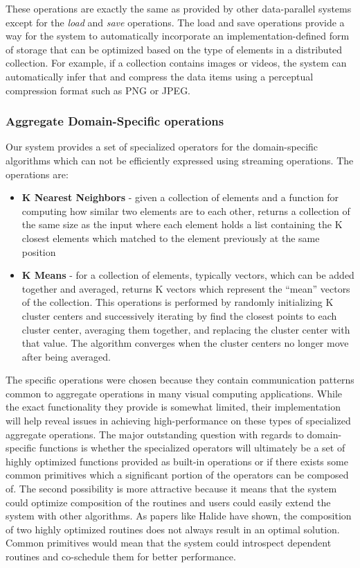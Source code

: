 \documentclass[tog]{acmsiggraph}
\begin{document}
These operations are exactly the same as provided by other data-parallel
systems except for the \textit{load} and \textit{save} operations. The load and
save operations provide a way for the system to automatically incorporate an
implementation-defined form of storage that can be optimized based on the type
of elements in a distributed collection. For example, if a collection contains
images or videos, the system can automatically infer that and compress the data
items using a perceptual compression format such as PNG or JPEG.

\subsubsection{Aggregate Domain-Specific operations}
Our system provides a set of specialized operators for the domain-specific
algorithms which can not be efficiently expressed using streaming
operations. The operations are:

\begin{itemize}
\item \textbf{K Nearest Neighbors} - given a collection of elements and a
  function for computing how similar two elements are to each other, returns a
  collection of the same size as the input where each element holds a list
  containing the K closest elements which matched to the element previously at
  the same position
\item \textbf{K Means} - for a collection of elements, typically vectors, which
  can be added together and averaged, returns K vectors which represent the
  ``mean'' vectors of the collection. This operations is performed by randomly
  initializing K cluster centers and successively iterating by find the closest
  points to each cluster center, averaging them together, and replacing the
  cluster center with that value. The algorithm converges when the cluster
  centers no longer move after being averaged.
\end{itemize}

The specific operations were chosen because they contain communication patterns
common to aggregate operations in many visual computing applications. While the
exact functionality they provide is somewhat limited, their implementation will
help reveal issues in achieving high-performance on these types of specialized
aggregate operations. The major outstanding question with regards to
domain-specific functions is whether the specialized operators will ultimately
be a set of highly optimized functions provided as built-in operations or if
there exists some common primitives which a significant portion of the
operators can be composed of. The second possibility is more attractive because
it means that the system could optimize composition of the routines and users
could easily extend the system with other algorithms. As papers like Halide
have shown, the composition of two highly optimized routines does not always
result in an optimal solution. Common primitives would mean that the system
could introspect dependent routines and co-schedule them for better
performance.
\end{document}
